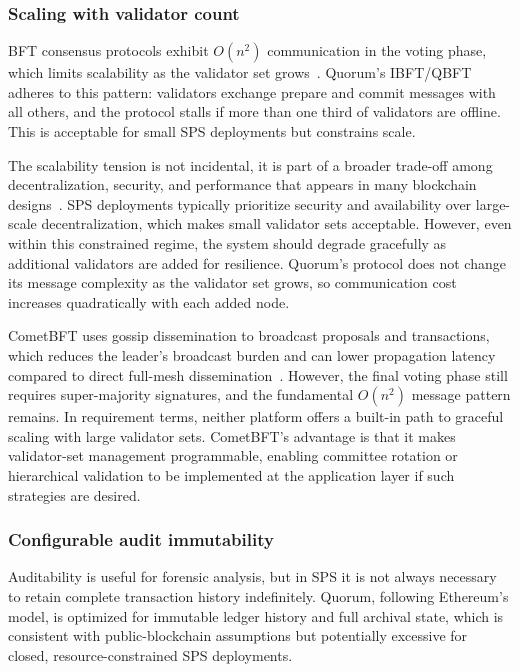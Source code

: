 \subsubsection{Scaling with validator count}
BFT consensus protocols exhibit $O(n^2)$ communication in the voting phase, which limits scalability as the validator set grows~\cite{wang2022bft}. Quorum's IBFT/QBFT adheres to this pattern: validators exchange prepare and commit messages with all others, and the protocol stalls if more than one third of validators are offline. This is acceptable for small SPS deployments but constrains scale.

The scalability tension is not incidental, it is part of a broader trade-off among decentralization, security, and performance that appears in many blockchain designs~\cite{monte2020scaling}. SPS deployments typically prioritize security and availability over large-scale decentralization, which makes small validator sets acceptable. However, even within this constrained regime, the system should degrade gracefully as additional validators are added for resilience. Quorum's protocol does not change its message complexity as the validator set grows, so communication cost increases quadratically with each added node.

CometBFT uses gossip dissemination to broadcast proposals and transactions, which reduces the leader's broadcast burden and can lower propagation latency compared to direct full-mesh dissemination~\cite{buchman2018latest}. However, the final voting phase still requires super-majority signatures, and the fundamental $O(n^2)$ message pattern remains. In requirement terms, neither platform offers a built-in path to graceful scaling with large validator sets. CometBFT's advantage is that it makes validator-set management programmable, enabling committee rotation or hierarchical validation to be implemented at the application layer if such strategies are desired.

\subsubsection{Configurable audit immutability}
Auditability is useful for forensic analysis, but in SPS it is not always necessary to retain complete transaction history indefinitely. Quorum, following Ethereum's model, is optimized for immutable ledger history and full archival state, which is consistent with public-blockchain assumptions but potentially excessive for closed, resource-constrained SPS deployments.

